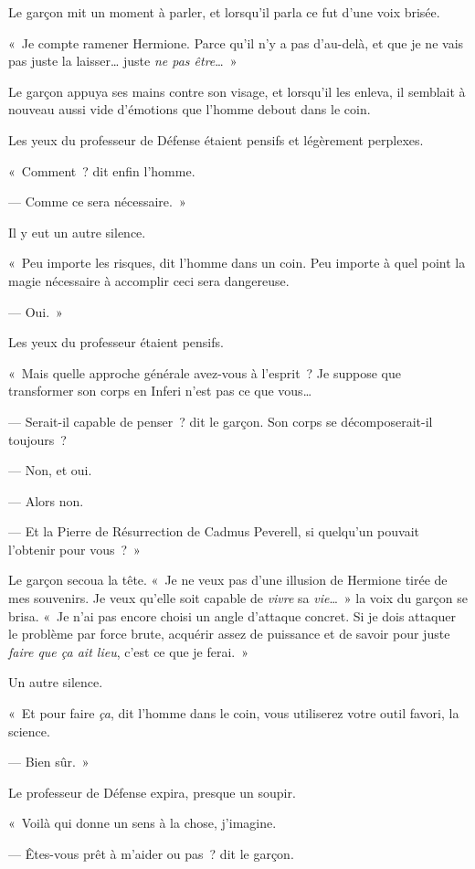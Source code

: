 Le garçon mit un moment à parler, et lorsqu'il parla ce fut d'une voix brisée.

«~Je compte ramener Hermione.
Parce qu'il n'y a pas d'au-delà, et que je ne vais pas juste la laisser… juste \emph{ne pas être}…~»

Le garçon appuya ses mains contre son visage, et lorsqu'il les enleva, il semblait à nouveau aussi vide d'émotions que l'homme debout dans le coin.

Les yeux du professeur de Défense étaient pensifs et légèrement perplexes.

«~Comment~? dit enfin l'homme.

--- Comme ce sera nécessaire.~»

Il y eut un autre silence.

«~Peu importe les risques, dit l'homme dans un coin.
Peu importe à quel point la magie nécessaire à accomplir ceci sera dangereuse.

--- Oui.~»

Les yeux du professeur étaient pensifs.

«~Mais quelle approche générale avez-vous à l'esprit~?
Je suppose que transformer son corps en Inferi n'est pas ce que vous…

--- Serait-il capable de penser~? dit le garçon.
Son corps se décomposerait-il toujours~?

--- Non, et oui.

--- Alors non.

--- Et la Pierre de Résurrection de Cadmus Peverell, si quelqu'un pouvait l'obtenir pour vous~?~»

Le garçon secoua la tête.
«~Je ne veux pas d'une illusion de Hermione tirée de mes souvenirs.
Je veux qu'elle soit capable de \emph{vivre} sa \emph{vie}…~»
la voix du garçon se brisa.
«~Je n'ai pas encore choisi un angle d'attaque concret.
Si je dois attaquer le problème par force brute, acquérir assez de puissance et de savoir pour juste \emph{faire que ça ait lieu}, c'est ce que je ferai.~»

Un autre silence.

«~Et pour faire \emph{ça}, dit l'homme dans le coin, vous utiliserez votre outil favori, la science.

--- Bien sûr.~»

Le professeur de Défense expira, presque un soupir.

«~Voilà qui donne un sens à la chose, j'imagine.

--- Êtes-vous prêt à m'aider ou pas~? dit le garçon.

